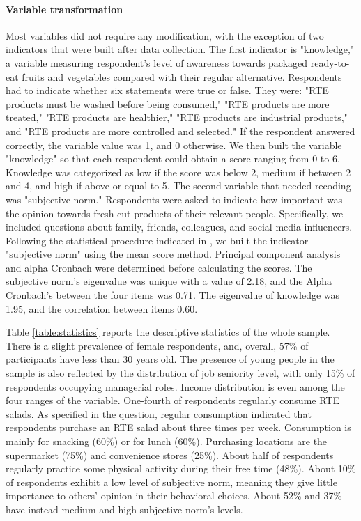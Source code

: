 \documentclass[a4,12pt]{article}
\begin{document}
\paragraph{Variable transformation} 
Most variables did not require any modification, with the exception of two indicators that were built after data collection. The first indicator is "knowledge," a variable measuring respondent's level of awareness towards packaged ready-to-eat fruits and vegetables compared with their regular alternative. Respondents had to indicate whether six statements were true or false. They were: "RTE products must be washed before being consumed," "RTE products are more treated," "RTE products are healthier," "RTE products are industrial products," and "RTE products are more controlled and selected."  If the respondent answered correctly, the variable value was 1, and 0 otherwise. We then built the variable "knowledge" so that each respondent could obtain a score ranging from 0 to 6. Knowledge was categorized as low if the score was below 2, medium if between 2 and 4, and high if above or equal to 5. 
The second variable that needed recoding was "subjective norm."  Respondents were asked to indicate how important was the opinion towards fresh-cut products of their relevant people. Specifically, we included questions about family, friends, colleagues, and social media influencers. Following the statistical procedure indicated in \cite{Acock08}, we built the indicator "subjective norm" using the mean score method.  
Principal component analysis and alpha Cronbach were determined before calculating the scores. The subjective norm's eigenvalue was unique with a value of 2.18, and the Alpha Cronbach's between the four items was 0.71. The eigenvalue of knowledge was 1.95, and the correlation between items 0.60. 

Table \ref{table:statistics} reports the descriptive statistics of the whole sample. There is a slight prevalence of female respondents, and, overall, 57\% of participants have less than 30 years old. The presence of young people in the sample is also reflected by the distribution of job seniority level, with only 15\% of respondents occupying managerial roles. Income distribution is even among the four ranges of the variable. One-fourth of respondents regularly consume RTE salads. As specified in the question, regular consumption indicated that respondents purchase an RTE salad about three times per week. Consumption is mainly for snacking (60\%) or for lunch (60\%). Purchasing locations are the supermarket (75\%) and convenience stores (25\%). About half of respondents regularly practice some physical activity during their free time (48\%). About 10\% of respondents exhibit a low level of subjective norm, meaning they give little importance to others' opinion in their behavioral choices. About 52\% and 37\% have instead medium and high subjective norm's levels. 
\end{document}
